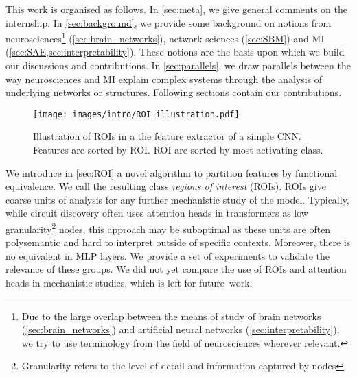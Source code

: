 \documentclass{article}
\begin{document}

This work is organised as follows. In \cref{sec:meta}, we give general comments on the internship. In \cref{sec:background}, we provide some background on notions from neurosciences\footnote{Due to the large overlap between the means of study of brain networks (\cref{sec:brain_networks}) and artificial neural networks (\cref{sec:interpretability}), we try to use terminology from the field of neurosciences wherever relevant.} (\cref{sec:brain_networks}), network sciences (\cref{sec:SBM}) and MI (\cref{sec:SAE,sec:interpretability}). These notions are the basis upon which we build our discussions and contributions. In \cref{sec:parallels}, we draw parallels between the way neurosciences and MI explain complex systems through the analysis of underlying networks or structures. Following sections contain our contributions.\\

\begin{wrapfigure}{r}{0.42\textwidth}
    \vspace{-4.em}
    \centering
    \texttt{[image: images/intro/ROI\_illustration.pdf]}
    \caption{Illustration of ROIs in a the feature extractor of a simple CNN. Features are sorted by ROI. ROI are sorted by most activating class.}
    \label{fig:ROI_illustration}
\end{wrapfigure}

We introduce in \cref{sec:ROI} a novel algorithm to partition features by functional equivalence. We call the resulting class \emph{regions of interest} (ROIs). ROIs give coarse units of analysis for any further mechanistic study of the model. Typically, while circuit discovery often uses attention heads in transformers as low granularity\footnote{Granularity refers to the level of detail and information captured by nodes} nodes, this approach may be suboptimal as these units are often polysemantic and hard to interpret outside of specific contexts. Moreover, there is no equivalent in MLP layers. We provide a set of experiments to validate the relevance of these groups. We did not yet compare the use of ROIs and attention heads in mechanistic studies, which is left for future~work.\\
\end{document}
